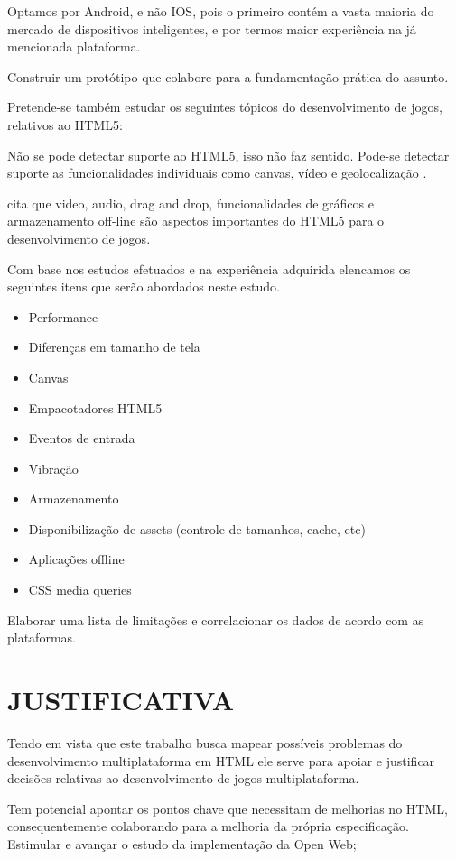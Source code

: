\documentclass[
12pt,
a4paper,
portuges,
draft
]{report}
\begin{document}
Optamos por Android, e não IOS, pois o primeiro contém
a vasta maioria do mercado de dispositivos inteligentes, e por termos
maior experiência na já mencionada plataforma.

Construir um protótipo que colabore para a fundamentação prática do assunto.

Pretende-se também estudar os seguintes tópicos do desenvolvimento de
jogos, relativos ao HTML5:

Não se pode detectar suporte ao HTML5, isso não faz sentido. Pode-se detectar suporte as funcionalidades individuais como canvas, vídeo e geolocalização \autocite{diveIntohtml}.

\cite{browserGamesTechnologyAndFuture} cita que video, audio, drag
and drop, funcionalidades de gráficos e armazenamento off-line são
aspectos importantes do HTML5 para o desenvolvimento de jogos.

Com base nos estudos efetuados e na experiência adquirida elencamos os
seguintes itens que serão abordados neste estudo.

\begin{itemize}
\item Performance
\item Diferenças em tamanho de tela
\item Canvas
\item Empacotadores HTML5
\item Eventos de entrada
\item Vibração
\item Armazenamento
\item Disponibilização de assets (controle de tamanhos, cache, etc)
\item Aplicações offline
\item CSS media queries
\end{itemize}

Elaborar uma lista de limitações e correlacionar os dados de acordo
com as plataformas.

\chapter{JUSTIFICATIVA}

Tendo em vista que este trabalho busca mapear possíveis problemas
do desenvolvimento multiplataforma em HTML ele serve para apoiar
e justificar decisões relativas ao desenvolvimento de jogos
multiplataforma.

Tem potencial apontar os pontos chave que necessitam
de melhorias no HTML, consequentemente colaborando para a
melhoria da própria especificação.
Estimular e avançar o estudo da implementação da Open Web;
\end{document}
